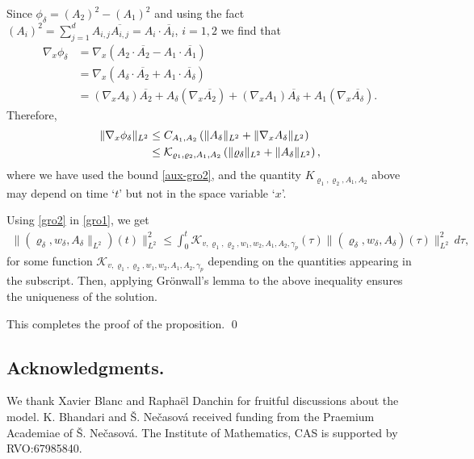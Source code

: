 \documentclass[11pt,twoside]{amsart}
\newcommand{\vr}{\varrho}
\begin{document}
Since $\phi_\delta= (A_2)^2-(A_1)^2$ and using the fact $(A_i)^2=\sum_{j=1}^d A_{i,j} \overline{A_{i,j}}=A_i \cdot \overline{A_i}$, $i=1,2$ we find that
\begin{align*}
\nabla_x \phi_\delta &= \nabla_x (  A_2\cdot \overline{A_2} -A_1\cdot \overline{A_1}  ) \\
& = \nabla_x (A_\delta \cdot \overline{A_2}  +  A_1 \cdot \overline{A_\delta}) \\
& = (\nabla_x A_\delta ) \overline{A_2} + A_\delta (\nabla_x \overline{A_2}) + 
(\nabla_x A_1) \overline{A_\delta} + A_1 (\nabla_x \overline{A_\delta}) .
\end{align*}
Therefore, 
\begin{align} 
\|\nabla_x\phi_\delta\|_{L^2} 
&\leq  C_{A_1, A_2} \left(\|A_\delta\|_{L^2}  + \|\nabla_x A_\delta\|_{L^2}  \right)  \notag \\
& \leq \mathcal K_{\varrho_1,\varrho_2,A_1, A_2} \left( \|\varrho_\delta\|_{L^2} + \|A_\delta\|_{L^2}  \right),
\label{gro2}
\end{align}
where we have used the bound \eqref{aux-gro2}, and the quantity $K_{\varrho_1,\varrho_2,A_1, A_2}$ above may depend on  time `$t$' but not in the space variable `$x$'.   


Using \eqref{gro2} in \eqref{gro1}, we get 
\begin{align*}
\|(\vr_\delta,w_\delta,A_\delta\|_{L^2})(t)\|^2_{L^2}\leq \int_0^t \mathcal K_{v, \varrho_1, \varrho_2, w_1, w_2, A_1, A_2, \gamma_p} (\tau)  \| (\varrho_\delta, w_\delta, A_\delta)(\tau)\|^2_{L^2} \, d \tau ,
\end{align*}
for some function $\mathcal K_{v, \varrho_1, \varrho_2, w_1, w_2, A_1, A_2, \gamma_p}$ depending on the quantities appearing in the subscript.
Then, applying Gr\"{o}nwall's lemma to the above inequality ensures the  uniqueness of the solution. 

This completes the proof of the proposition. \qed

\bigskip 

\subsection*{Acknowledgments.}
We thank Xavier Blanc and Rapha\"{e}l Danchin for fruitful discussions about the model. K. Bhandari and \v{S}. Ne{\v{c}}asov{\'{a}} received funding from   the  Praemium Academiae of \v{S}.  Ne{\v{c}}asov{\'{a}}. The Institute of Mathematics, CAS is supported by RVO:67985840.


\appendix 
\end{document}
